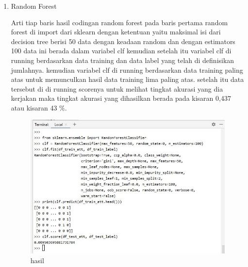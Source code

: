 \begin{enumerate}
\item Random Forest\par
Arti tiap baris hasil codingan random forest pada baris pertama random forest di import dari sklearn dengan ketentuan yaitu maksimal isi dari decision tree berisi 50 data dengan keadaan random dan dengan estimators 100 data ini berada dalam variabel clf kemudian setelah itu variabel clf di running berdasarkan data training dan data label yang telah di definisikan jumlahnya. kemudian variabel clf di running berdasarkan data training paling atas untuk memunculkan hasil data training lima paling atas. setelah itu data tersebut di di running scorenya untuk melihat tingkat akurasi yang dia kerjakan maka tingkat akurasi yang dihasilkan berada pada kisaran 0,437 atau kisaran 43 \%.

\begin{figure}[ht]
\centering
\includegraphics[scale=0.5]{figures/1174051/3/7.JPG}
\caption{hasil}
\label{contoh}
\end{figure}


\end{enumerate}
